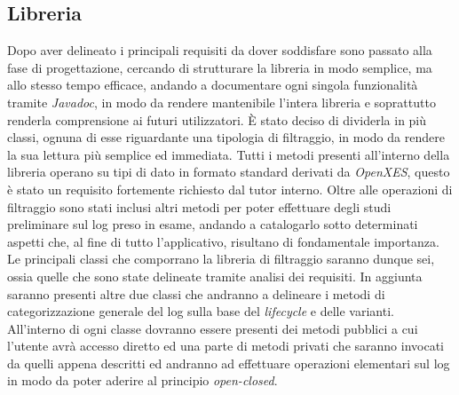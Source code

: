 \subsection{Libreria}
Dopo aver delineato i principali requisiti da dover soddisfare sono passato alla fase di progettazione, cercando di strutturare la libreria in modo semplice, ma allo stesso tempo efficace, andando a documentare ogni singola funzionalità tramite \textit{\gls{Javadoc}}, in modo da rendere mantenibile l'intera libreria e soprattutto renderla comprensione ai futuri utilizzatori. È stato deciso di dividerla in più classi, ognuna di esse riguardante una tipologia di filtraggio, in modo da rendere la sua lettura più semplice ed immediata. Tutti i metodi presenti all'interno della libreria operano su tipi di dato in formato standard derivati da \textit{OpenXES}, questo è stato un requisito fortemente richiesto dal tutor interno. Oltre alle operazioni di filtraggio sono stati inclusi altri metodi per poter effettuare degli studi preliminare sul log preso in esame, andando a catalogarlo sotto determinati aspetti che, al fine di tutto l'applicativo, risultano di fondamentale importanza. Le principali classi che comporrano la libreria di filtraggio saranno dunque sei, ossia quelle che sono state delineate tramite analisi dei requisiti.
In aggiunta saranno presenti altre due classi che andranno a delineare i metodi di categorizzazione generale del log sulla base del \textit{lifecycle} e delle varianti. All'interno di ogni classe dovranno essere presenti dei metodi pubblici a cui l'utente avrà accesso diretto ed una parte di metodi privati che saranno invocati da quelli appena descritti ed andranno ad effettuare operazioni elementari sul log in modo da poter aderire al principio \textit{\gls{open-closed}}.
